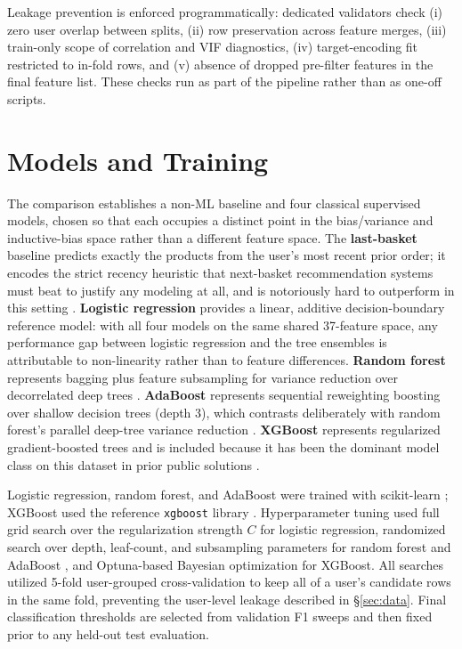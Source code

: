 \documentclass[10pt,twocolumn]{article}
\begin{document}
Leakage prevention is enforced programmatically: dedicated validators check (i) zero user overlap between splits, (ii) row preservation across feature merges, (iii) train-only scope of correlation and VIF diagnostics, (iv) target-encoding fit restricted to in-fold rows, and (v) absence of dropped pre-filter features in the final feature list. These checks run as part of the pipeline rather than as one-off scripts.

\section{Models and Training}

The comparison establishes a non-ML baseline and four classical supervised models, chosen so that each occupies a distinct point in the bias/variance and inductive-bias space rather than a different feature space. The \textbf{last-basket} baseline predicts exactly the products from the user's most recent prior order; it encodes the strict recency heuristic that next-basket recommendation systems must beat to justify any modeling at all, and is notoriously hard to outperform in this setting \citep{olsonswanson2018instacart}. \textbf{Logistic regression} provides a linear, additive decision-boundary reference model: with all four models on the same shared 37-feature space, any performance gap between logistic regression and the tree ensembles is attributable to non-linearity rather than to feature differences. \textbf{Random forest} represents bagging plus feature subsampling for variance reduction over decorrelated deep trees \citep{breiman2001random}. \textbf{AdaBoost} represents sequential reweighting boosting over shallow decision trees (depth 3), which contrasts deliberately with random forest's parallel deep-tree variance reduction \citep{freund1997adaboost}. \textbf{XGBoost} represents regularized gradient-boosted trees and is included because it has been the dominant model class on this dataset in prior public solutions \citep{chen2016xgboost,onodera2017instacart,syntheticjohn2019instacart}.

Logistic regression, random forest, and AdaBoost were trained with scikit-learn \citep{pedregosa2011sklearn}; XGBoost used the reference \texttt{xgboost} library \citep{chen2016xgboost}. Hyperparameter tuning used full grid search over the regularization strength $C$ for logistic regression, randomized search over depth, leaf-count, and subsampling parameters for random forest and AdaBoost \citep{bergstra2012random}, and Optuna-based Bayesian optimization \citep{akiba2019optuna} for XGBoost. All searches utilized 5-fold user-grouped cross-validation to keep all of a user's candidate rows in the same fold, preventing the user-level leakage described in \S\ref{sec:data}. Final classification thresholds are selected from validation F1 sweeps and then fixed prior to any held-out test evaluation.
\end{document}
